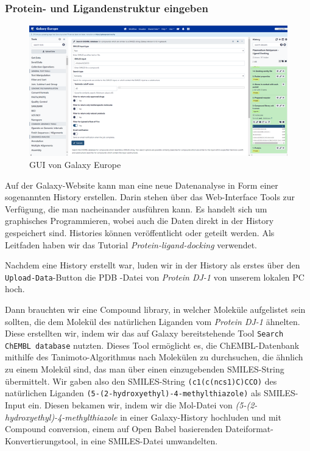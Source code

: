 \documentclass[10pt]{article}
\begin{document}
    \subsubsection{Protein- und Ligandenstruktur eingeben}\label{subsubsec:protein--und-ligandenstruktur-eingeben}

    \begin{figure}
        \includegraphics[width=\linewidth]{Aussehen der Galaxy-Website}
        \caption{GUI von Galaxy Europe}
    \end{figure}

    Auf der Galaxy-Website kann man eine neue Datenanalyse in Form einer sogenannten History erstellen.
    Darin stehen über das Web-Interface Tools zur Verfügung, die man nacheinander ausführen kann.
    Es handelt sich um graphisches Programmieren, wobei auch die Daten direkt in der History gespeichert sind.
    Histories können veröffentlicht oder geteilt werden.
    Als Leitfaden haben wir das Tutorial \emph{Protein-ligand-docking} verwendet.\cite{4}

    Nachdem eine History erstellt war, luden wir in der History als erstes über den \texttt{Upload-Data}-Button die PDB
    -Datei von \emph{Protein DJ-1} von unserem lokalen PC hoch.

    Dann brauchten wir eine Compound library, in welcher Moleküle aufgelistet sein sollten, die dem Molekül des
    natürlichen Liganden vom \emph{Protein DJ-1} ähnelten. Diese erstellten wir, indem wir das auf Galaxy
    bereitstehende Tool \texttt{Search ChEMBL database} nutzten.\cite{2} Dieses Tool ermöglicht es, die
    ChEMBL-Datenbank
    mithilfe
    des Tanimoto-Algorithmus nach Molekülen zu durchsuchen, die ähnlich zu einem Molekül sind, das man über einen
    einzugebenden SMILES-String übermittelt. Wir gaben also den SMILES-String \texttt{(c1(c(ncs1)C)CCO)} des natürlichen
    Liganden \texttt{(5-(2-hydroxyethyl)-4-methylthiazole)} als SMILES-Input ein. Diesen bekamen wir, indem wir die
    Mol-Datei
    von \emph{(5-(2-hydroxyethyl)-4-methylthiazole} in einer Galaxy-History hochluden und mit Compound conversion, einem
    auf Open Babel basierenden Dateiformat-Konvertierungstool, in eine SMILES-Datei umwandelten.\cite{3}
\end{document}
